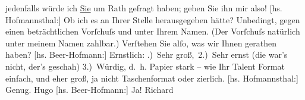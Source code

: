 \begin{ledgroupsized}[t]{13cm}
               jedenfalls würde ich \uline{Sie} um Rath gefragt haben; geben
               Sie ihn mir also!\pend
           \pstart
           {[}hs. Hofmannsthal:{]} Ob ich es an Ihrer Stelle herausgegeben hätte? Unbedingt,
               gegen einen beträchtlichen Vorſchuſs und unter Ihrem Namen. (Der Vorſchuſs natürlich
               unter meinem Namen zahlbar.)\pend
           \pstart
           Verſtehen Sie alſo, was wir Ihnen gerathen haben?\pend
           \pstart
           {[}hs. Beer-Hofmann:{]} Ernstlich:\pend
           \settowidth{\longeste}{3) Ausstattung}\settowidth{\longestz}{entscheiden}\settowidth{\longestd}{}\settowidth{\longestv}{}\settowidth{\longestf}{}\addtolength\longeste{1em}
        \addtolength\longestz{1em}
      \pstart\noindent{}\makebox[\the\longestz][l]{}
                  \pend\pstart\noindent{}
                  \pend\pstart\noindent{}\makebox[\the\longestz][l]{}
                  \pend{}.) Sehr groß, 2.) Sehr ernst (die war’s nicht, der’s geschah) 3.) Würdig, d. h.
               Papier stark – wie Ihr Talent Format einfach, und eher groß, ja nicht Taschenformat
               oder zierlich.\pend
           \pstart
           {[}hs. Hofmannsthal:{]} Genug. \spacefill\mbox{Hugo}\pend
           \pstart
           {[}hs. Beer-Hofmann:{]} Ja! \spacefill\mbox{Richard}\pend
           \pstart
           \noindent{}\label{T_L01269_1v}\label{T_L01269_1h}\pend
           \endnumbering{}\end{ledgroupsized}  \newcommand{\dateiname}{L01269}\newcommand{\titel}{Hugo von Hofmannsthal und Richard Beer-Hofmann an Arthur Schnitzler, [15.? 2. 1903]}\newcommand{\editorInnen}{Martin Anton Müller und Gerd-Hermann Susen}
      